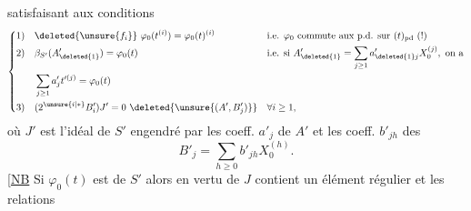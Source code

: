 satisfaisant aux conditions
\[
 \left\{\begin{aligned}
 1)\quad&\deleted{\unsure{f_i}}\ \varphi_0(t^{(i)})=\varphi_0(t)^{(i)}
 &&\text{i.e. }\varphi_0\text{ commute aux p.d. sur }(t)_{\mathrm{pd}}\ (!)\\
 2)\quad&\beta_{S'}(A'_{\deleted{1}})=\varphi_0(t)
 &&\text{i.e. si }A'_{\deleted{1}}=\sum_{j\geq1}a'_{\deleted{1}j}X_0^{(j)},\text{ on a}\\
 &\sum_{j\geq1}a'_j t'^{(j)}=\varphi_0(t)\\
 3)\quad&(2^{\unsure{i|*}}B'_i)J'=0\ \deleted{\unsure{(A',B'_j)}}
 &&\forall i\geq1,
 \end{aligned}\right.
\]
où $J'$ est l'idéal de $S'$ engendré par les coeff. $a'_j$ de $A'$ et les coeff. $b'_{jh}$ des
\[
 B'_j=\sum_{h\geq0}b'_{jh}X_0^{(h)}.
\]
[\uline{NB} Si $\varphi_0(t)$ est   de $S'$ alors en vertu de  $J$ contient un élément régulier et les relations 
